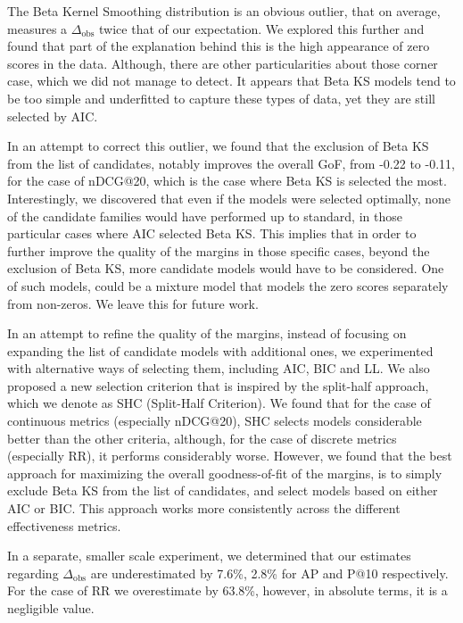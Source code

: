 The Beta Kernel Smoothing distribution is an obvious outlier, that on average, measures a $\Delta_{\text{obs}}$ twice that of our expectation. We explored this further and found that part of the explanation behind this is the high appearance of zero scores in the data. Although, there are other particularities about those corner case, which we did not manage to detect. It appears that Beta KS models tend to be too simple and underfitted to capture these types of data, yet they are still selected by AIC. 

In an attempt to correct this outlier, we found that the exclusion of Beta KS from the list of candidates, notably improves the overall GoF, from -0.22 to -0.11, for the case of nDCG@20, which is the case where Beta KS is selected the most. Interestingly, we discovered that even if the models were selected optimally, none of the candidate families would have performed up to standard, in those particular cases where AIC selected Beta KS. This implies that in order to further improve the quality of the margins in those specific cases, beyond the exclusion of Beta KS, more candidate models would have to be considered. One of such models, could be a mixture model that models the zero scores separately from non-zeros. We leave this for future work.

In an attempt to refine the quality of the margins, instead of focusing on expanding the list of candidate models with additional ones, we experimented with alternative ways of selecting them, including AIC, BIC and LL. We also proposed a new selection criterion that is inspired by the split-half approach, which we denote as SHC (Split-Half Criterion). We found that for the case of continuous metrics (especially nDCG@20), SHC selects models considerable better than the other criteria, although, for the case of discrete metrics (especially RR), it performs considerably worse. However, we found that the best approach for maximizing the overall goodness-of-fit of the margins, is to simply exclude Beta KS from the list of candidates, and select models based on either AIC or BIC. This approach works more consistently across the different effectiveness metrics.

In a separate, smaller scale experiment, we determined that our estimates regarding $\Delta_{\text{obs}}$ are underestimated by 7.6\%, 2.8\% for AP and P@10 respectively. For the case of RR we overestimate by 63.8\%, however, in absolute terms, it is a negligible value.









